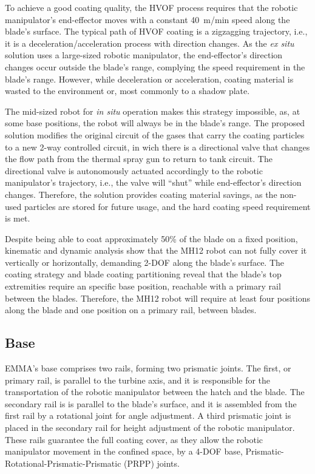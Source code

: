 To achieve a good coating quality, the HVOF process requires that the robotic
manipulator's end-effector moves with a constant 40~m/min speed along the
blade's surface. The typical path of HVOF coating is a zigzagging trajectory,
i.e., it is a deceleration/acceleration process with direction changes. As the
\textit{ex situ} solution uses a large-sized robotic manipulator, the
end-effector's direction changes occur outside the blade's range, complying the
speed requirement in the blade's range. However, while deceleration or
acceleration, coating material is wasted to the environment or, most commonly
to a shadow plate.

The mid-sized robot for \textit{in situ} operation makes this strategy
impossible, as, at some base positions, the robot will always be in the blade's
range. The proposed solution modifies the original circuit of the gases that
carry the coating particles to a new 2-way controlled circuit, in wich there is a directional
valve that changes the flow path from the thermal spray gun to return to tank
circuit. %
The directional valve is autonomously actuated accordingly to the robotic
manipulator's trajectory, i.e., the valve will ``shut'' while end-effector's
direction changes. Therefore, the solution provides coating material savings,
as the non-used particles are stored for future usage, and the hard coating
speed requirement is met.

Despite being able to coat approximately 50\% of the blade on a fixed
position, kinematic and dynamic analysis show that the MH12 robot can not fully
cover it vertically or horizontally, demanding 2-DOF along the blade's surface.
The coating strategy and blade coating partitioning reveal that the blade's top
extremities require an specific base position, reachable
with a primary rail between the blades. Therefore, the MH12 robot will require
at least four positions along the blade and one position on a primary
rail, between blades. 

\subsection{Base}

EMMA's base comprises two rails, forming two prismatic joints. The
first, or primary rail, is parallel to the turbine axis, and it is responsible
for the transportation of the robotic manipulator between the hatch and the
blade. The secondary rail is is parallel to the blade's surface, and it is
assembled from the first rail by a rotational joint for angle adjustment. A
third prismatic joint is placed in the secondary rail for height adjustment of
the robotic manipulator. These rails guarantee the full coating cover, as they
allow the robotic manipulator movement in the confined space, by a 4-DOF
base, Prismatic-Rotational-Prismatic-Prismatic (PRPP) joints. 

